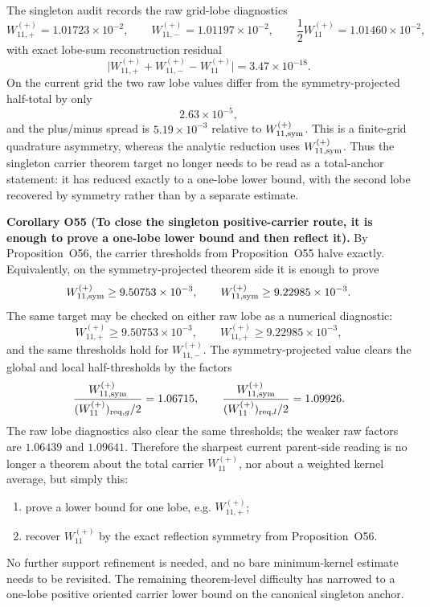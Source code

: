 \documentclass[aps,prd,onecolumn,notitlepage,nofootinbib,superscriptaddress,11pt,floatfix]{revtex4-2}
\begin{document}
The singleton audit
records the raw grid-lobe diagnostics
\[
W_{11,+}^{(+)}=1.01723\times10^{-2},
\qquad
W_{11,-}^{(+)}=1.01197\times10^{-2},
\qquad
\frac12 W_{11}^{(+)}=1.01460\times10^{-2},
\]
with exact lobe-sum reconstruction residual
\[
\bigl|W_{11,+}^{(+)}+W_{11,-}^{(+)}-W_{11}^{(+)}\bigr|
=
3.47\times10^{-18}.
\]
On the current grid the two raw lobe values differ from the symmetry-projected half-total by only
\[
2.63\times10^{-5},
\]
and the plus/minus spread is \(5.19\times10^{-3}\) relative to \(W_{11,{\rm sym}}^{(+)}\).  This is a finite-grid quadrature asymmetry, whereas the analytic reduction uses \(W_{11,{\rm sym}}^{(+)}\).  Thus the singleton carrier theorem target no longer needs to be read as a total-anchor statement: it has reduced exactly to a one-lobe lower bound, with the second lobe recovered by symmetry rather than by a separate estimate.

\medskip\noindent\textbf{Corollary O55 (To close the singleton positive-carrier route, it is enough to prove a one-lobe lower bound and then reflect it).}
By Proposition~O56, the carrier thresholds from Proposition~O55 halve exactly.  Equivalently, on the symmetry-projected theorem side it is enough to prove
\[
W_{11,{\rm sym}}^{(+)}\ge 9.50753\times10^{-3},
\qquad
W_{11,{\rm sym}}^{(+)}\ge 9.22985\times10^{-3}.
\]
The same target may be checked on either raw lobe as a numerical diagnostic:
\[
W_{11,+}^{(+)}\ge 9.50753\times10^{-3},
\qquad
W_{11,+}^{(+)}\ge 9.22985\times10^{-3},
\]
and the same thresholds hold for \(W_{11,-}^{(+)}\).  The symmetry-projected value clears the global and local half-thresholds by the factors
\[
\frac{W_{11,{\rm sym}}^{(+)}}{(W_{11}^{(+)})_{{\rm req},g}/2}=1.06715,
\qquad
\frac{W_{11,{\rm sym}}^{(+)}}{(W_{11}^{(+)})_{{\rm req},l}/2}=1.09926.
\]
The raw lobe diagnostics also clear the same thresholds; the weaker raw factors are \(1.06439\) and \(1.09641\).
Therefore the sharpest current parent-side reading is no longer a theorem about the total carrier \(W_{11}^{(+)}\), nor about a weighted kernel average, but simply this:
\begin{enumerate}
\item prove a lower bound for one lobe, e.g. \(W_{11,+}^{(+)}\);
\item recover \(W_{11}^{(+)}\) by the exact reflection symmetry from Proposition~O56.
\end{enumerate}
No further support refinement is needed, and no bare minimum-kernel estimate needs to be revisited.  The remaining theorem-level difficulty has narrowed to a one-lobe positive oriented carrier lower bound on the canonical singleton anchor.
\end{document}
